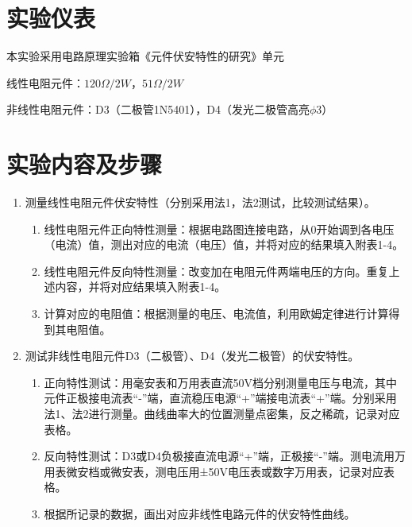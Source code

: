 \documentclass[a4paper]{article}
\begin{document}
\section{实验仪表}
本实验采用电路原理实验箱《元件伏安特性的研究》单元\par 线性电阻元件：$120\Omega/2W$，$51\Omega/2W$\par 非线性电阻元件：D3（二极管1N5401），D4（发光二极管高亮$\phi3$）

\section{实验内容及步骤}
\begin{enumerate}
    \item 测量线性电阻元件伏安特性（分别采用法1，法2测试，比较测试结果）。
        \begin{enumerate}
            \item 线性电阻元件正向特性测量：根据电路图连接电路，从0开始调到各电压（电流）值，测出对应的电流（电压）值，并将对应的结果填入附表1-4。
            \item 线性电阻元件反向特性测量：改变加在电阻元件两端电压的方向。重复上述内容，并将对应结果填入附表1-4。
            \item 计算对应的电阻值：根据测量的电压、电流值，利用欧姆定律进行计算得到其电阻值。
        \end{enumerate}
    \item 测试非线性电阻元件D3（二极管）、D4（发光二极管）的伏安特性。
        \begin{enumerate}
            \item 正向特性测试：用毫安表和万用表直流50V档分别测量电压与电流，其中元件正极接电流表“-”端，直流稳压电源“+”端接电流表“+”端。分别采用法1、法2进行测量。曲线曲率大的位置测量点密集，反之稀疏，记录对应表格。
            \item 反向特性测试：D3或D4负极接直流电源“+”端，正极接“-”端。测电流用万用表微安档或微安表，测电压用±50V电压表或数字万用表，记录对应表格。
            \item 根据所记录的数据，画出对应非线性电路元件的伏安特性曲线。
        \end{enumerate}

\end{enumerate}

\newpage
\end{document}
